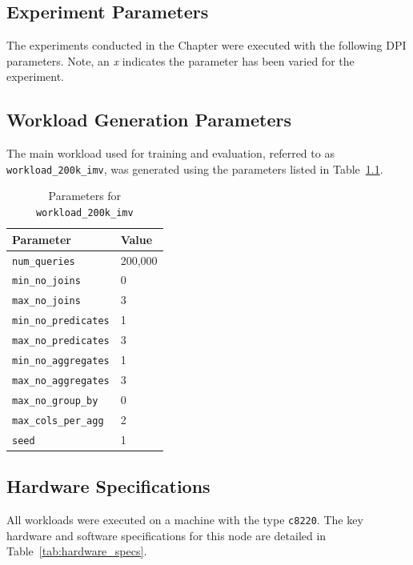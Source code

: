 
\begin{appendices}

\makeatletter
{}

\chapter{Experiment Parameters}
\label{appendix:experiment_parameters}
The experiments conducted in the  Chapter were executed with the following DPI parameters. Note, an \textit{x} indicates the parameter has been varied for the experiment.

\section{Workload Generation Parameters}
\label{sec:workload_parameters}
The main workload used for training and evaluation, referred to as \texttt{workload\_200k\_imv}, was generated using the parameters listed in Table~\ref{tab:workload_params}.

\begin{table}[h!]
  \centering
  \caption{Parameters for \texttt{workload\_200k\_imv}}
  \label{tab:workload_params}
  \begin{tabular}{ll}
    \toprule
      \textbf{Parameter} & \textbf{Value} \\ 
    \midrule
      \texttt{num\_queries} & 200,000 \\
      \texttt{min\_no\_joins} & 0 \\
      \texttt{max\_no\_joins} & 3 \\
      \texttt{min\_no\_predicates} & 1 \\
      \texttt{max\_no\_predicates} & 3 \\
      \texttt{min\_no\_aggregates} & 1 \\
      \texttt{max\_no\_aggregates} & 3 \\
      \texttt{max\_no\_group\_by} & 0 \\
      \texttt{max\_cols\_per\_agg} & 2 \\
      \texttt{seed} & 1 \\ 
    \bottomrule
  \end{tabular}
\end{table}


\section{Hardware Specifications}
\label{sec:hardware_specs}
All workloads were executed on a machine with the type \texttt{c8220}. The key hardware and software specifications for this node are detailed in Table~\ref{tab:hardware_specs}.


\end{appendices}
